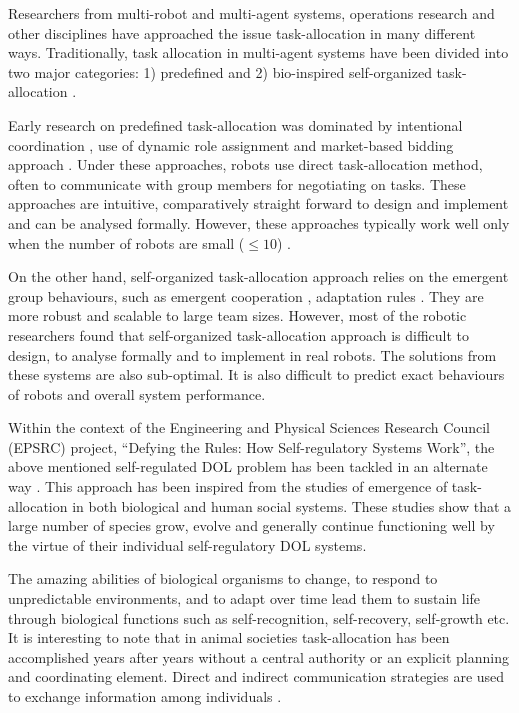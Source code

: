 Researchers from multi-robot and multi-agent systems, operations research and other disciplines have approached the issue task-allocation in many different ways. Traditionally, task allocation in  multi-agent systems have been divided into two major categories: 1) predefined and 2) bio-inspired self-organized task-allocation \cite{Shen+2001}.

Early research on predefined task-allocation was dominated by intentional coordination \cite{Parker2008}, use of dynamic role assignment \cite{Chaimowicz2002} and market-based bidding approach \cite{Dias+2006}. Under these approaches, robots use direct task-allocation method, often to communicate with group members for negotiating on tasks. These approaches are intuitive, comparatively straight forward to design and implement and can be analysed formally. However, these approaches typically work well only when the number of robots are small ($\leq 10$) \cite{Lerman+2006}.

On the other hand, self-organized task-allocation approach relies on the emergent group behaviours, such as emergent cooperation \cite{Kube+1993}, adaptation rules \cite{Liu+2007}. They are more robust and scalable to large team sizes. However, most of the robotic researchers found that self-organized task-allocation approach is difficult to design, to analyse formally and to implement in real robots. The solutions from these systems are also sub-optimal. It is also difficult to predict exact behaviours of robots and overall system performance.

Within the context of the Engineering and Physical Sciences Research Council (EPSRC) project, ``Defying the Rules: How Self-regulatory Systems Work'', the above mentioned self-regulated DOL problem has been tackled in an alternate way \cite{Arcaute+2008}. This approach has been inspired from the studies of emergence of task-allocation in both biological and human social systems. These studies show that a large number of species grow, evolve and generally continue functioning well by the virtue of their individual self-regulatory DOL systems.

The amazing abilities of biological organisms to change, to respond to unpredictable environments, and to adapt over time lead them to sustain life through biological functions such as self-recognition, self-recovery, self-growth etc. It is interesting to note that in animal societies task-allocation has been accomplished years after years without a central authority or an explicit planning and coordinating element. Direct and indirect communication strategies are used to exchange information among individuals \cite{Camazine+2001}.

